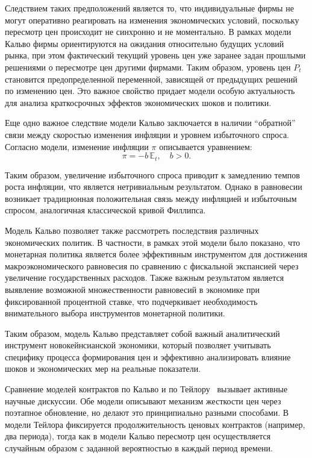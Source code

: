 Следствием таких предположений является то, что индивидуальные фирмы не могут оперативно реагировать на изменения экономических условий, поскольку пересмотр цен происходит не синхронно и не моментально. В рамках модели Кальво фирмы ориентируются на ожидания относительно будущих условий рынка, при этом фактический текущий уровень цен уже заранее задан прошлыми решениями о пересмотре цен другими фирмами. Таким образом, уровень цен \( P_t \) становится предопределенной переменной, зависящей от предыдущих решений по изменению цен. Это важное свойство придает модели особую актуальность для анализа краткосрочных эффектов экономических шоков и политики.

Еще одно важное следствие модели Кальво заключается в наличии \enquote{обратной} связи между скоростью изменения инфляции и уровнем избыточного спроса. Согласно модели, изменение инфляции \( \pi \) описывается уравнением:
\begin{equation}
	\label{eq:equation20}
	\pi = -b \, \mathbb{E}_t, \quad b > 0.
\end{equation}

Таким образом, увеличение избыточного спроса приводит к замедлению темпов роста инфляции, что является нетривиальным результатом. Однако в равновесии возникает традиционная положительная связь между инфляцией и избыточным спросом, аналогичная классической кривой Филлипса.

Модель Кальво позволяет также рассмотреть последствия различных экономических политик. В частности, в рамках этой модели было показано, что монетарная политика является более эффективным инструментом для достижения макроэкономического равновесия по сравнению с фискальной экспансией через увеличение государственных расходов. Также важным результатом является выявление возможной множественности равновесий в экономике при фиксированной процентной ставке, что подчеркивает необходимость внимательного выбора инструментов монетарной политики.

Таким образом, модель Кальво представляет собой важный аналитический инструмент новокейнсианской экономики, который позволяет учитывать специфику процесса формирования цен и эффективно анализировать влияние шоков и экономических мер на реальные показатели.

Сравнение моделей контрактов по Кальво и по Тейлору~\cite{Taylor1980} вызывает активные научные дискуссии. Обе модели описывают механизм жесткости цен через поэтапное обновление, но делают это принципиально разными способами. В модели Тейлора фиксируется продолжительность ценовых контрактов (например, два периода), тогда как в модели Кальво пересмотр цен осуществляется случайным образом с заданной вероятностью в каждый период времени.

